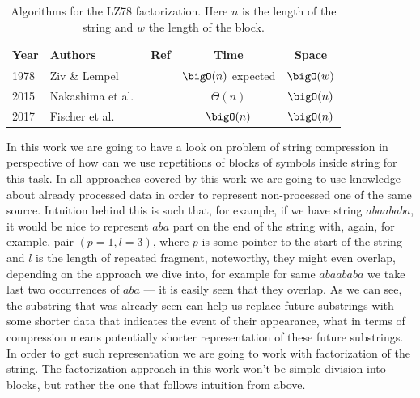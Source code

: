 \begin{table}[H]
    \centering
    \setlength{\tabcolsep}{11pt}
    \renewcommand{\arraystretch}{1.1}
    \begin{tabular}{llccc}
        \toprule
        Year & Authors & Ref & Time & Space \\
        \midrule
        1978 & Ziv \& Lempel      & \cite{ziv1978}     & \(\bigO(n)\) expected & \(\bigO(w)\) \\
        2015 & Nakashima et al.\  & \cite{nakashima2015} & \(\Theta(n)\)       & \(\bigO(n)\) \\
        2017 & Fischer et al.\    & \cite{fischer2017} & \(\bigO(n)\)          & \(\bigO(n)\) \\
        \bottomrule
    \end{tabular}
    \caption{Algorithms for the LZ78 factorization. Here \(n\) is the length of the string and \(w\) the length of the block.}
    \label{tab:related-work-lz78}
\end{table}

% 

In this work we are going to have a look on problem of string compression in perspective of how can we use repetitions of blocks of symbols inside string for this task. In all approaches covered by this work we are going to use knowledge about already processed data in order to represent non-processed one of the same source. Intuition behind this is such that, for example, if we have string \(abaababa\), it would be nice to represent \(aba\) part on the end of the string with, again, for example, pair \((p = 1, l = 3)\), where \(p\) is some pointer to the start of the string and \(l\) is the length of repeated fragment, noteworthy, they might even overlap, depending on the approach we dive into, for example for same \(abaababa\) we take last two occurrences of \(aba\) --- it is easily seen that they overlap. As we can see, the substring that was already seen can help us replace future substrings with some shorter data that indicates the event of their appearance, what in terms of compression means potentially shorter representation of these future substrings. In order to get such representation we are going to work with factorization of the string. The factorization approach in this work won't be simple division into blocks, but rather the one that follows intuition from above. 
\\


